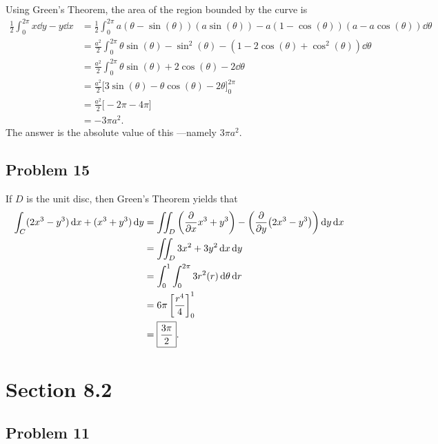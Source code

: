 \documentclass[11pt]{article}
\begin{document}
Using Green's Theorem, the area of the region bounded by the curve is 
\begin{align*}
	\frac{1}{2} \int_{0}^{2\pi} x \dd{y} - y \dd{x} &= \frac{1}{2} \int_{0}^{2\pi} a(\theta - \sin(\theta))(a \sin(\theta)) - a(1 - \cos(\theta))(a - a \cos(\theta)) \dd{\theta} \\
	&= \frac{a^{2}}{2} \int_{0}^{2\pi} \theta \sin(\theta) - \sin^{2}(\theta) - (1 - 2 \cos(\theta) + \cos^{2}(\theta)) \dd{\theta} \\
	&= \frac{a^{2}}{2} \int_{0}^{2\pi} \theta \sin(\theta) + 2\cos(\theta) - 2 \dd{\theta} \\
	&= \frac{a^{2}}{2} \big[ 3\sin(\theta) - \theta \cos(\theta) - 2 \theta \big]_{0}^{2\pi} \\
	&= \frac{a^{2}}{2} \big[ -2\pi - 4\pi \big] \\
	&= -3 \pi a^{2}.
\end{align*}
The answer is the absolute value of this ---namely $\boxed{3\pi a^{2}}$.


\subsection*{Problem 15}

If $D$ is the unit disc, then Green's Theorem yields that
\begin{align*}
	\int_{C} (2x^{3} - y^{3}) \dd{x} + (x^{3} + y^{3}) \dd{y} &= \iint_{D} \left( \pdv{x} x^{3} + y^{3} \right) - \left( \pdv{y} (2x^{3} - y^{3}) \right) \dd{y} \dd{x} \\
	&= \iint_{D} 3x^{2} + 3y^{2} \dd{x} \dd{y} \\
	&= \int_{0}^{1} \int_{0}^{2\pi} 3r^{2}(r) \dd{\theta} \dd{r} \\
	&= 6\pi \left[ \frac{r^{4}}{4} \right]_{0}^{1} \\
	&= \boxed{\frac{3\pi}{2}}.
\end{align*}


\section{Section 8.2}


\subsection*{Problem 11}
\end{document}
